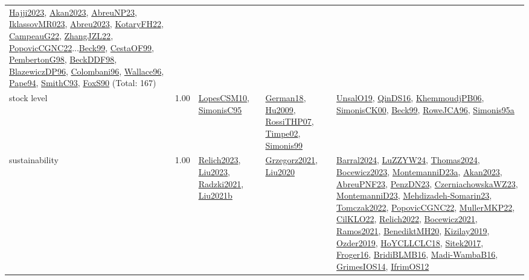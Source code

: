 {\begin{longtable}{p{3cm}r>{\raggedright\arraybackslash}p{6cm}>{\raggedright\arraybackslash}p{6cm}>{\raggedright\arraybackslash}p{8cm}}
\hyperref[detail:Hajji2023]{Hajji2023}, \hyperref[detail:Akan2023]{Akan2023}, \hyperref[detail:AbreuNP23]{AbreuNP23}, \hyperref[detail:IklassovMR023]{IklassovMR023}, \hyperref[detail:Abreu2023]{Abreu2023}, \hyperref[detail:KotaryFH22]{KotaryFH22}, \hyperref[detail:CampeauG22]{CampeauG22}, \hyperref[detail:ZhangJZL22]{ZhangJZL22}, \hyperref[detail:PopovicCGNC22]{PopovicCGNC22}...\hyperref[detail:Beck99]{Beck99}, \hyperref[detail:CestaOF99]{CestaOF99}, \hyperref[detail:PembertonG98]{PembertonG98}, \hyperref[detail:BeckDDF98]{BeckDDF98}, \hyperref[detail:BlazewiczDP96]{BlazewiczDP96}, \hyperref[detail:Colombani96]{Colombani96}, \hyperref[detail:Wallace96]{Wallace96}, \hyperref[detail:Pape94]{Pape94}, \hyperref[detail:SmithC93]{SmithC93}, \hyperref[detail:FoxS90]{FoxS90} (Total: 167)\\
\index{stock level}\index{Concepts!stock level}stock level &  1.00 & \hyperref[detail:LopesCSM10]{LopesCSM10}, \hyperref[detail:SimonisC95]{SimonisC95} & \hyperref[detail:German18]{German18}, \hyperref[detail:Hu2009]{Hu2009}, \hyperref[detail:RossiTHP07]{RossiTHP07}, \hyperref[detail:Timpe02]{Timpe02}, \hyperref[detail:Simonis99]{Simonis99} & \hyperref[detail:UnsalO19]{UnsalO19}, \hyperref[detail:QinDS16]{QinDS16}, \hyperref[detail:KhemmoudjPB06]{KhemmoudjPB06}, \hyperref[detail:SimonisCK00]{SimonisCK00}, \hyperref[detail:Beck99]{Beck99}, \hyperref[detail:RoweJCA96]{RoweJCA96}, \hyperref[detail:Simonis95a]{Simonis95a}\\
\index{sustainability}\index{Concepts!sustainability}sustainability &  1.00 & \hyperref[detail:Relich2023]{Relich2023}, \hyperref[detail:Liu2023]{Liu2023}, \hyperref[detail:Radzki2021]{Radzki2021}, \hyperref[detail:Liu2021b]{Liu2021b} & \hyperref[detail:Grzegorz2021]{Grzegorz2021}, \hyperref[detail:Liu2020]{Liu2020} & \hyperref[detail:Barral2024]{Barral2024}, \hyperref[detail:LuZZYW24]{LuZZYW24}, \hyperref[detail:Thomas2024]{Thomas2024}, \hyperref[detail:Bocewicz2023]{Bocewicz2023}, \hyperref[detail:MontemanniD23a]{MontemanniD23a}, \hyperref[detail:Akan2023]{Akan2023}, \hyperref[detail:AbreuPNF23]{AbreuPNF23}, \hyperref[detail:PenzDN23]{PenzDN23}, \hyperref[detail:CzerniachowskaWZ23]{CzerniachowskaWZ23}, \hyperref[detail:MontemanniD23]{MontemanniD23}, \hyperref[detail:Mehdizadeh-Somarin23]{Mehdizadeh-Somarin23}, \hyperref[detail:Tomczak2022]{Tomczak2022}, \hyperref[detail:PopovicCGNC22]{PopovicCGNC22}, \hyperref[detail:MullerMKP22]{MullerMKP22}, \hyperref[detail:CilKLO22]{CilKLO22}, \hyperref[detail:Relich2022]{Relich2022}, \hyperref[detail:Bocewicz2021]{Bocewicz2021}, \hyperref[detail:Ramos2021]{Ramos2021}, \hyperref[detail:BenediktMH20]{BenediktMH20}, \hyperref[detail:Kizilay2019]{Kizilay2019}, \hyperref[detail:Ozder2019]{Ozder2019}, \hyperref[detail:HoYCLLCLC18]{HoYCLLCLC18}, \hyperref[detail:Sitek2017]{Sitek2017}, \hyperref[detail:Froger16]{Froger16}, \hyperref[detail:BridiBLMB16]{BridiBLMB16}, \hyperref[detail:Madi-WambaB16]{Madi-WambaB16}, \hyperref[detail:GrimesIOS14]{GrimesIOS14}, \hyperref[detail:IfrimOS12]{IfrimOS12}\\

\end{longtable}}
